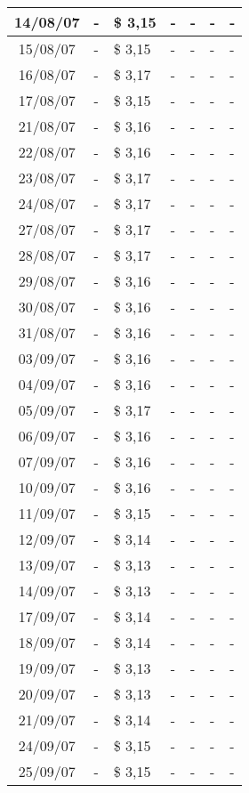 \begin{center}
\begin{longtable}{|c|p{1.5cm}|p{1.5cm}|p{1.5cm}|p{1.5cm}|p{1.5cm}|p{1.5cm}|}
14/08/07 & - & \$ 3,15 & - & - & - & - \\ \hline
15/08/07 & - & \$ 3,15 & - & - & - & - \\ \hline
16/08/07 & - & \$ 3,17 & - & - & - & - \\ \hline
17/08/07 & - & \$ 3,15 & - & - & - & - \\ \hline
21/08/07 & - & \$ 3,16 & - & - & - & - \\ \hline
22/08/07 & - & \$ 3,16 & - & - & - & - \\ \hline
23/08/07 & - & \$ 3,17 & - & - & - & - \\ \hline
24/08/07 & - & \$ 3,17 & - & - & - & - \\ \hline
27/08/07 & - & \$ 3,17 & - & - & - & - \\ \hline
28/08/07 & - & \$ 3,17 & - & - & - & - \\ \hline
29/08/07 & - & \$ 3,16 & - & - & - & - \\ \hline
30/08/07 & - & \$ 3,16 & - & - & - & - \\ \hline
31/08/07 & - & \$ 3,16 & - & - & - & - \\ \hline
03/09/07 & - & \$ 3,16 & - & - & - & - \\ \hline
04/09/07 & - & \$ 3,16 & - & - & - & - \\ \hline
05/09/07 & - & \$ 3,17 & - & - & - & - \\ \hline
06/09/07 & - & \$ 3,16 & - & - & - & - \\ \hline
07/09/07 & - & \$ 3,16 & - & - & - & - \\ \hline
10/09/07 & - & \$ 3,16 & - & - & - & - \\ \hline
11/09/07 & - & \$ 3,15 & - & - & - & - \\ \hline
12/09/07 & - & \$ 3,14 & - & - & - & - \\ \hline
13/09/07 & - & \$ 3,13 & - & - & - & - \\ \hline
14/09/07 & - & \$ 3,13 & - & - & - & - \\ \hline
17/09/07 & - & \$ 3,14 & - & - & - & - \\ \hline
18/09/07 & - & \$ 3,14 & - & - & - & - \\ \hline
19/09/07 & - & \$ 3,13 & - & - & - & - \\ \hline
20/09/07 & - & \$ 3,13 & - & - & - & - \\ \hline
21/09/07 & - & \$ 3,14 & - & - & - & - \\ \hline
24/09/07 & - & \$ 3,15 & - & - & - & - \\ \hline
25/09/07 & - & \$ 3,15 & - & - & - & - \\ \hline

\end{longtable}
\end{center}
